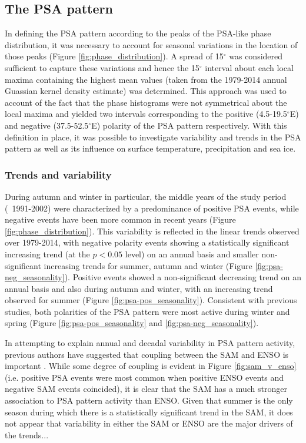 \subsection{The PSA pattern}\label{s:psa_results}

In defining the PSA pattern according to the peaks of the PSA-like phase distribution, it was necessary to account for seasonal variations in the location of those peaks (Figure \ref{fig:phase_distribution}). A spread of 15$^{\circ}$ was considered sufficient to capture these variations and hence the 15$^{\circ}$ interval about each local maxima containing the highest mean values (taken from the 1979-2014 annual Guassian kernel density estimate) was determined. This approach was used to account of the fact that the phase histograms were not symmetrical about the local maxima and yielded two intervals corresponding to the positive (4.5-19.5$^{\circ}$E) and negative (37.5-52.5$^{\circ}$E) polarity of the PSA pattern respectively. With this definition in place, it was possible to investigate variability and trends in the PSA pattern as well as its influence on surface temperature, precipitation and sea ice. 

\subsubsection{Trends and variability}

During autumn and winter in particular, the middle years of the study period (~1991-2002) were characterized by a predominance of positive PSA events, while negative events have been more common in recent years (Figure \ref{fig:phase_distribution}). This variability is reflected in the linear trends observed over 1979-2014, with negative polarity events showing a statistically significant increasing trend (at the $p < 0.05$ level) on an annual basis and smaller non-significant increasing trends for summer, autumn and winter (Figure \ref{fig:psa-neg_seasonality}). Positive events showed a non-significant decreasing trend on an annual basis and also during autumn and winter, with an increasing trend observed for summer (Figure \ref{fig:psa-pos_seasonality}). Consistent with previous studies, both polarities of the PSA pattern were most active during winter and spring (Figure \ref{fig:psa-pos_seasonality} and \ref{fig:psa-neg_seasonality}). 

In attempting to explain annual and decadal variability in PSA pattern activity, previous authors have suggested that coupling between the SAM and ENSO is important \citep[e.g.][]{Fogt2006}. While some degree of coupling is evident in Figure \ref{fig:sam_v_enso} (i.e. positive PSA events were most common when positive ENSO events and negative SAM events coincided), it is clear that the SAM has a much stronger association to PSA pattern activity than ENSO. Given that summer is the only season during which there is a statistically significant trend in the SAM, it does not appear that variability in either the SAM or ENSO are the major drivers of the trends...



